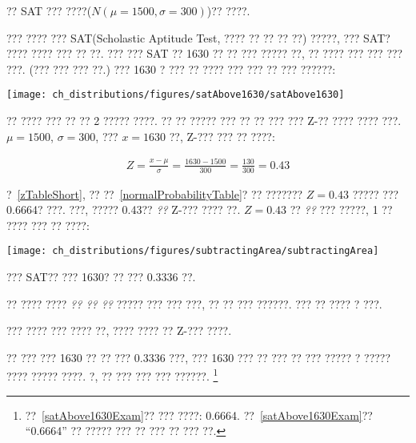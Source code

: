 ?? SAT ??? ????($N(\mu=1500, \sigma=300)$)?? ????.

\begin{example}{??? ???? ??? SAT(Scholastic Aptitude Test, ???? ?? ?? ?? ??) ?????, ??? SAT? ???? ???? ??? ?? ??. ??? ??? SAT ?? 1630 ?? ?? ??? ?????}\label{satAbove1630Exam}
??, ?? ???? ??? ??? ??? ???. (??? ??? ??? ??.) ??? 1630 ? ??? ?? ???? ??? ??? ?? ??? ??????:
\begin{center}
\texttt{[image: ch\_distributions/figures/satAbove1630/satAbove1630]}
\end{center}
?? ???? ??? ?? ?? 2 ????? ????. ?? ?? ????? ??? ?? ?? ??? ??? Z-?? ???? ???? ???. $\mu=1500$, $\sigma=300$, ??? $x=1630$ ??, Z-??? ??? ?? ????:

\begin{eqnarray*}
Z = \frac{x - \mu}{\sigma} = \frac{1630 - 1500}{300} = \frac{130}{300} = 0.43
\end{eqnarray*}

?~\ref{zTableShort}, ?? ??~\vref{normalProbabilityTable}? ?? ??????? $Z=0.43$ ????? ??? 0.6664? ???. ???, ????? 0.43?? \emph{??} Z-??? ???? ??. $Z=0.43$ ?? \emph{??} ??? ?????, 1 ?? ???? ??? ?? ????:

\begin{center}
\texttt{[image: ch\_distributions/figures/subtractingArea/subtractingArea]}
\end{center}
??? SAT?? ??? 1630? ?? ??? 0.3336 ??.
\end{example}

\begin{tipBox}{
?? ???? ???? \emph{?? ?? ??} ????? ??? ??? ???, ?? ?? ??? ??????. ??? ?? ???? ? ???. \vspace{3mm}

??? ???? ??? ???? ??, ???? ???? ?? Z-??? ????.\vspace{1mm}}
\end{tipBox}

\begin{exercise}
?? ??? ??? 1630 ?? ?? ??? 0.3336 ???, ??? 1630 ??? ?? ??? ?? ??? ????? ? ????? ???? ????? ????. ?, ?? ??? ??? ??? ??????. 
\footnote{??~\ref{satAbove1630Exam}?? ??? ????: 0.6664. ??~\ref{satAbove1630Exam}?? ``0.6664'' ?? ????? ??? ?? ??? ?? ??? ??.}
\end{exercise}

